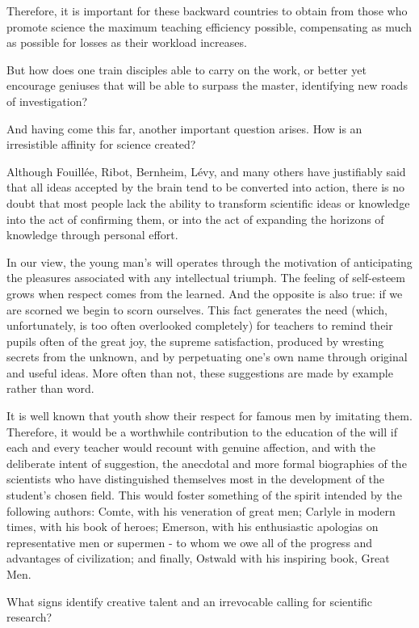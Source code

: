 \documentclass{article}
\begin{document}
Therefore, it is important for these backward countries to obtain from those who promote science the maximum teaching efficiency possible, compensating as much as possible for losses as their workload increases.

But how does one train disciples able to carry on the work, or better yet encourage geniuses that will be able to surpass the master, identifying new roads of investigation?

And having come this far, another important question arises. How is an irresistible affinity for science created?

Although Fouillée, Ribot, Bernheim, Lévy, and many others have justifiably said that all ideas accepted by the brain tend to be converted into action, there is no doubt that most people lack the ability to transform scientific ideas or knowledge into the act of confirming them, or into the act of expanding the horizons of knowledge through personal effort.

In our view, the young man’s will operates through the motivation of anticipating the pleasures associated with any intellectual triumph. The feeling of self-esteem grows when respect comes from the learned. And the opposite is also true: if we are scorned we begin to scorn ourselves. This fact generates the need (which, unfortunately, is too often overlooked completely) for teachers to remind their pupils often of the great joy, the supreme satisfaction, produced by wresting secrets from the unknown, and by perpetuating one’s own name through original and useful ideas. More often than not, these suggestions are made by example rather than word.

It is well known that youth show their respect for famous men by imitating them. Therefore, it would be a worthwhile contribution to the education of the will if each and every teacher would recount with genuine affection, and with the deliberate intent of suggestion, the anecdotal and more formal biographies of the scientists who have distinguished themselves most in the development of the student’s chosen field. This would foster something of the spirit intended by the following authors: Comte, with his veneration of great men; Carlyle in modern times, with his book of heroes; Emerson, with his enthusiastic apologias on representative men or supermen - to whom we owe all of the progress and advantages of civilization; and finally, Ostwald with his inspiring book, Great Men.

What signs identify creative talent and an irrevocable calling for scientific research?
\end{document}
